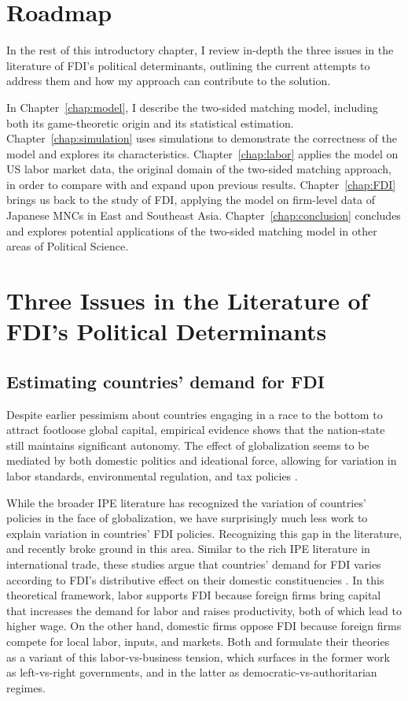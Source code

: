 \section{Roadmap}

In the rest of this introductory chapter, I review in-depth the three issues in
the literature of FDI's political determinants, outlining the current attempts
to address them and how my approach can contribute to the solution.

In Chapter~\ref{chap:model}, I describe the two-sided matching model, including
both its game-theoretic origin and its statistical estimation.
Chapter~\ref{chap:simulation} uses simulations to demonstrate the correctness of
the model and explores its characteristics. Chapter~\ref{chap:labor} applies the
model on US labor market data, the original domain of the two-sided matching
approach, in order to compare with and expand upon previous results.
Chapter~\ref{chap:FDI} brings us back to the study of FDI, applying the model on
firm-level data of Japanese MNCs in East and Southeast Asia.
Chapter~\ref{chap:conclusion} concludes and explores potential applications of
the two-sided matching model in other areas of Political Science.

\section{Three Issues in the Literature of FDI's Political Determinants}
\label{sec:literature_issues}

\subsection{Estimating countries' demand for FDI}

Despite earlier pessimism about countries engaging in
a race to the bottom to attract footloose global capital, empirical evidence shows
that the nation-state still maintains significant autonomy. The effect of
globalization seems to be mediated by both domestic politics and ideational
force, allowing for variation in labor standards, environmental regulation, and
tax policies \citep{Drezner2001}.

While the broader IPE literature has recognized the variation of
countries' policies in the face of globalization, we have surprisingly much less
work to explain variation in countries' FDI policies. Recognizing this gap in the literature, \citet{Pinto2013} and \citet{Pandya2016} recently
broke ground in this area. Similar to the rich IPE literature in international trade, these studies argue that countries' demand for FDI varies
according to FDI's distributive effect on their domestic constituencies
\citep{Broz2001, Milner2005a}. In this theoretical framework, labor supports FDI
because foreign firms bring capital that increases the demand for labor and
raises productivity, both of which lead to higher wage. On the other hand,
domestic firms oppose FDI because foreign firms compete for local labor, inputs,
and markets. Both \citet{Pinto2013} and \citet{Pandya2016} formulate their
theories as a variant of this labor-vs-business tension, which surfaces in the
former work as left-vs-right governments, and in the latter as
democratic-vs-authoritarian regimes.


